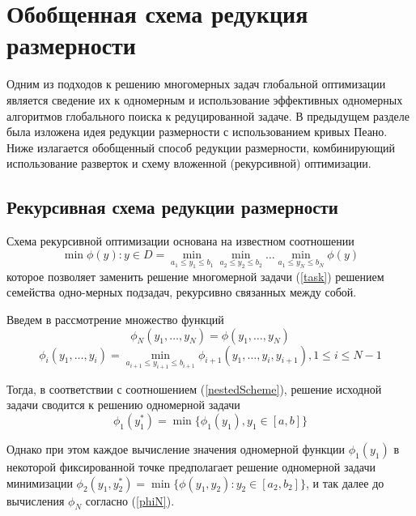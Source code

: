 \documentclass[a4paper]{article}
\begin{document}
\section{Обобщенная схема редукция размерности}
Одним из подходов к решению многомерных задач глобальной оптимизации является сведение их к одномерным и использование эффективных одномерных алгоритмов глобального поиска к редуцированной задаче. В предыдущем разделе была изложена идея редукции размерности с использованием кривых Пеано. Ниже излагается обобщенный способ редукции размерности, комбинирующий использование разверток и схему вложенной (рекурсивной) оптимизации.
\subsection{Рекурсивная схема редукции размерности}
Схема рекурсивной оптимизации основана на известном \cite{gorodGrishOptBook} соотношении
\begin{equation}
\label{nestedScheme}
\min{\phi(y):y\in D}=\min_{a_1\leqslant y_1\leqslant b_1}\min_{a_2\leqslant y_2\leqslant b_2}\dots\min_{a_1\leqslant y_N\leqslant b_N}\phi(y)
\end{equation}
которое позволяет заменить решение многомерной задачи (\ref{task}) решением семейства одно-мерных подзадач, рекурсивно связанных между собой.
\par
Введем в рассмотрение множество функций 
\begin{equation}
\label{phiN}
\phi_N(y_1,\dots,y_N)=\phi(y_1,\dots,y_N)
\end{equation}
\begin{equation}
\phi_i(y_1,\dots,y_i)=\min_{a_{i+1}\leqslant y_{i+1} \leqslant b_{i+1}}\phi_{i+1}(y_1,\dots,y_i,y_{i+1}),1\leqslant i\leqslant N-1
\end{equation}
\par
Тогда, в соответствии с соотношением (\ref{nestedScheme}), решение исходной задачи  сводится к решению одномерной задачи
\begin{equation}
\label{phiFirst}
\phi_1(y_1^*)=\min\{\phi_1(y_1),y_1\in [a,b]\}
\end{equation}
\par
Однако при этом каждое вычисление значения одномерной функции \(\phi_1(y_1)\) в некоторой фиксированной точке предполагает решение одномерной задачи минимизации \(\phi_2(y_1,y_2^*)=\min\{\phi(y_1,y_2):y_2\in [a_2,b_2]\}\), и так далее до вычисления \(\phi_N\) согласно (\ref{phiN}).
\end{document}
